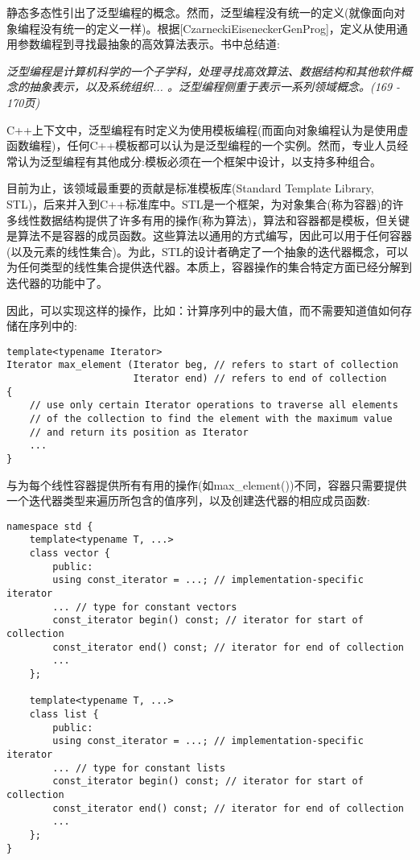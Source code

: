 静态多态性引出了泛型编程的概念。然而，泛型编程没有统一的定义(就像面向对象编程没有统一的定义一样)。根据[CzarneckiEiseneckerGenProg]，定义从使用通用参数编程到寻找最抽象的高效算法表示。书中总结道:

\textit{泛型编程是计算机科学的一个子学科，处理寻找高效算法、数据结构和其他软件概念的抽象表示，以及系统组织... 。泛型编程侧重于表示一系列领域概念。(169 - 170页)}

C++上下文中，泛型编程有时定义为使用模板编程(而面向对象编程认为是使用虚函数编程)，任何C++模板都可以认为是泛型编程的一个实例。然而，专业人员经常认为泛型编程有其他成分:模板必须在一个框架中设计，以支持多种组合。

目前为止，该领域最重要的贡献是标准模板库(Standard Template Library, STL)，后来并入到C++标准库中。STL是一个框架，为对象集合(称为容器)的许多线性数据结构提供了许多有用的操作(称为算法)，算法和容器都是模板，但关键是算法不是容器的成员函数。这些算法以通用的方式编写，因此可以用于任何容器(以及元素的线性集合)。为此，STL的设计者确定了一个抽象的迭代器概念，可以为任何类型的线性集合提供迭代器。本质上，容器操作的集合特定方面已经分解到迭代器的功能中了。

因此，可以实现这样的操作，比如：计算序列中的最大值，而不需要知道值如何存储在序列中的:

\begin{lstlisting}[style=styleCXX]
template<typename Iterator>
Iterator max_element (Iterator beg, // refers to start of collection
					  Iterator end) // refers to end of collection
{
	// use only certain Iterator operations to traverse all elements
	// of the collection to find the element with the maximum value
	// and return its position as Iterator
	...
}
\end{lstlisting}

与为每个线性容器提供所有有用的操作(如max\_element())不同，容器只需要提供一个迭代器类型来遍历所包含的值序列，以及创建迭代器的相应成员函数:

\begin{lstlisting}[style=styleCXX]
namespace std {
	template<typename T, ...>
	class vector {
		public:
		using const_iterator = ...; // implementation-specific iterator
		... // type for constant vectors
		const_iterator begin() const; // iterator for start of collection
		const_iterator end() const; // iterator for end of collection
		...
	};

	template<typename T, ...>
	class list {
		public:
		using const_iterator = ...; // implementation-specific iterator
		... // type for constant lists
		const_iterator begin() const; // iterator for start of collection
		const_iterator end() const; // iterator for end of collection
		...
	};
}
\end{lstlisting}

